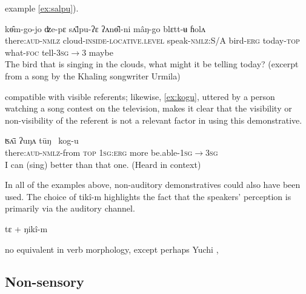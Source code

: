 \documentclass[oneside,a4paper,11pt]{article}
\newcommand{\ipa}[1]{{\phon \mbox{#1}}} %
\begin{document}
 example \ref{ex:salpu}).

\begin{exe}
\ex \label{ex:salpu}
\gll    	 	\ipa{tikî-m}   	\ipa{kɵ̂m-go-jo}   	\ipa{ʣe-pɛ}   	\ipa{sʌ̄lpu-ʔɛ}   	\ipa{ʔʌnɵ̂l-ni}   	\ipa{mâŋ-go}   	\ipa{blɛtt-ʉ}   	\ipa{ɦolʌ}   
 \\
 there:\textsc{aud}-\textsc{nmlz} cloud-\textsc{inside-locative.level} speak-\textsc{nmlz:}S/A bird-\textsc{erg} today-\textsc{top} what-\textsc{foc} tell-\textsc{3sg$\rightarrow$3} maybe \\
\glt The bird that is singing in the clouds, what might it be telling today? (excerpt from a song by the Khaling songwriter Urmila)
\end{exe}
 

compatible with visible referents; likewise,   \ref{ex:kogu}, uttered by a person watching a song contest on the television, makes it clear that the visibility or non-visibility of the referent is not a relevant factor in using this demonstrative.

\begin{exe}
\ex \label{ex:kogu}
\gll  	\ipa{tikî-m-kʌ}   	\ipa{ʦʌ̄i} \ipa{ʔuŋʌ} \ipa{tūŋ }   	\ipa{kog-u}   \\
there:\textsc{aud}-\textsc{nmlz}-from \textsc{top} \textsc{1sg:erg} more be.able-\textsc{1sg$\rightarrow$3sg}	  \\
\glt I can (sing) better than that one. (Heard in context)
\end{exe}

 

In all of the examples above, non-auditory demonstratives could also have been used. The choice of \ipa{tikî-m}  highlights the  fact that the  speakers' perception is primarily via the auditory channel.
 
 \ipa{tɛ} + \ipa{ŋikî-m}

 
no equivalent in verb morphology, except perhaps Yuchi \citealt[37]{aikhenvald06}
\citet{wagner38yuchi}, \citet{linn01euchee}



 
\citet{aikhenvald14knowledge}
 
 
 
\subsection{Non-sensory} 
 
\citet[282]{lowe99nambiquara} 
 
\end{document}
